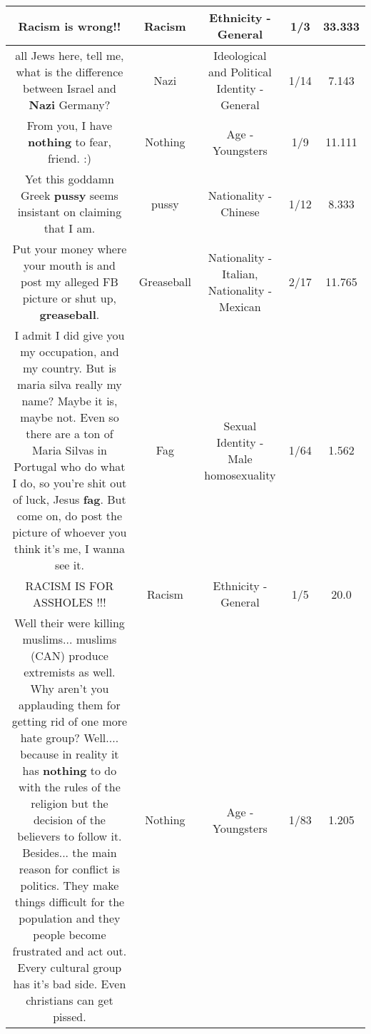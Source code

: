 \documentclass[11pt]{article}
\newlength\mylength
\begin{document}
\begin{center}
\begin{longtable}{|C{.65\mylength}|C{.30\mylength}|C{.12\mylength}|C{.12\mylength}|C{.12\mylength}|}
  \small Racism is wrong!!\normalsize   & Racism & Ethnicity - General & 1/3 & 33.333 \\  \hline
  \small all Jews here,  tell me, what is the difference between Israel and \textbf{Nazi} Germany?\normalsize   & Nazi &  Ideological and Political Identity - General & 1/14 & 7.143 \\  \hline
  \small From you, I have \textbf{nothing} to fear, friend. :)\normalsize   & Nothing & Age - Youngsters & 1/9 & 11.111 \\  \hline
  \small Yet this goddamn Greek \textbf{pussy} seems insistant on claiming that I am.\normalsize   & pussy & Nationality - Chinese & 1/12 & 8.333 \\  \hline
  \small Put your money where your mouth is and post my alleged FB picture or shut up, \textbf{g\textbf{reaseball}}.\normalsize   & Greaseball & Nationality - Italian, Nationality - Mexican & 2/17 & 11.765 \\  \hline
  \small I admit I did give you my occupation, and my country. But is maria silva really my name? Maybe it is, maybe not. Even so there are a ton of Maria Silvas in Portugal who do what I do, so you're shit out of luck, Jesus \textbf{fag}. But come on, do post the picture of whoever you think it's me, I wanna see it.\normalsize   & Fag & Sexual Identity - Male homosexuality & 1/64 & 1.562 \\  \hline
  \small RACISM IS FOR ASSHOLES !!!\normalsize   & Racism & Ethnicity - General & 1/5 & 20.0 \\  \hline
  \small Well their were killing muslims... muslims (CAN) produce extremists as well. Why aren't you applauding them for getting rid of one more hate group? Well.... because in reality it has \textbf{nothing} to do with the rules of the religion but the decision of the believers to follow it. Besides... the main reason for conflict is politics. They make things difficult for the population and they people become frustrated and act out. Every cultural group has it's bad side. Even christians can get pissed.\normalsize   & Nothing & Age - Youngsters & 1/83 & 1.205 \\  \hline

\end{longtable}
\end{center}
\end{document}
